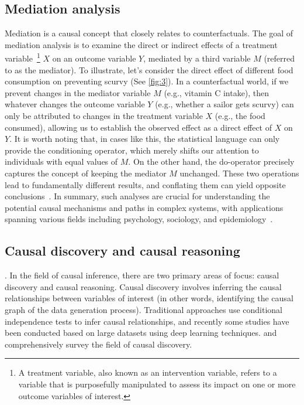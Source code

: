 \documentclass[10pt]{article} %
\theoremstyle{definition}
\begin{document}
\subsection{Mediation analysis}
Mediation is a causal concept that closely relates to counterfactuals. The goal of mediation analysis is to examine the direct or indirect effects of a treatment variable~\footnote{A treatment variable, also known as an intervention variable, refers to a variable that is purposefully manipulated to assess its impact on one or more outcome variables of interest.} $X$ on an outcome variable $Y$, mediated by a third variable $M$ (referred to as the mediator). To illustrate, let's consider the direct effect of different food consumption on preventing scurvy (See \figurename\ref{fig:3}). In a counterfactual world, if we prevent changes in the mediator variable $M$ (e.g., vitamin C intake), then whatever changes the outcome variable $Y$ (e.g., whether a sailor gets scurvy) can only be attributed to changes in the treatment variable $X$ (e.g., the food consumed), allowing us to establish the observed effect as a direct effect of $X$ on $Y$. It is worth noting that, in cases like this, the statistical language can only provide the conditioning operator, which merely shifts our attention to individuals with equal values of $M$. On the other hand, the do-operator precisely captures the concept of keeping the mediator $M$ unchanged. These two operations lead to fundamentally different results, and conflating them can yield opposite conclusions~\citep[Chapter~9]{pearlBookWhyNew2018}. In summary, such analyses are crucial for understanding the potential causal mechanisms and paths in complex systems, with applications spanning various fields including psychology, sociology, and epidemiology~\citep{careyCausalFairnessField2022}.

\subsection{Causal discovery and causal reasoning}.
In the field of causal inference, there are two primary areas of focus: causal discovery and causal reasoning. Causal discovery involves inferring the causal relationships between variables of interest (in other words, identifying the causal graph of the data generation process). Traditional approaches use conditional independence tests to infer causal relationships, and recently some studies have been conducted based on large datasets using deep learning techniques. \citet{glymourReviewCausalDiscovery2019} and \citet{vowelsYaDAGsSurvey2022} comprehensively survey the field of causal discovery.
\end{document}
